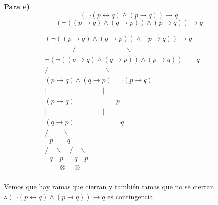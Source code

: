 \textbf{Para e)}
\[
(\neg(p \leftrightarrow q) \land (p \rightarrow q)) \rightarrow q
\]
\[
(\neg((p \rightarrow q)\land (q \rightarrow p)) \land (p \rightarrow q)) \rightarrow q
\]
\begin{center}
\[
\begin{array}{c}
(\neg((p \rightarrow q)\land (q \rightarrow p)) \land (p \rightarrow q)) \rightarrow q \\
\quad \quad \quad \quad / \quad \quad \quad \quad \quad \quad \quad \backslash \\
\neg(\neg((p \rightarrow q)\land (q \rightarrow p)) \land (p \rightarrow q))\quad \quad  q \quad \quad\\
/ \quad \quad \quad \quad \quad \quad \quad \quad\backslash \quad \quad \quad \quad\\
(p \rightarrow q)\land (q \rightarrow p) \quad  \neg (p \rightarrow q) \quad \quad \\
| \quad \quad  \quad \quad  \quad \quad \quad \quad | \\
(p \rightarrow q) \quad \quad  \quad \quad  \quad \quad  p \\
| \quad \quad  \quad \quad  \quad \quad \quad \quad | \\
(q \rightarrow p) \quad \quad  \quad \quad  \quad \quad  \neg q \\
/ \quad \quad \backslash \quad \quad  \quad \quad \quad \quad \quad  \\
\neg p \quad \quad q \quad \quad  \quad \quad \quad \quad \quad  \\
/ \quad \backslash \quad / \quad \backslash \quad  \quad \quad \quad \quad \quad  \\
\neg q \quad p \quad \neg q \quad p \quad  \quad \quad \quad \quad \quad  \\
\quad  \quad \otimes  \quad \otimes  \quad  \quad  \quad \quad \quad \quad \quad  \\

\end{array}
\]
\end{center}
Vemos que hay ramas que cierran y también ramas que no se cierran\\
$\therefore (\neg(p \leftrightarrow q) \land (p \rightarrow q)) \rightarrow q$ es contingencia.\\

